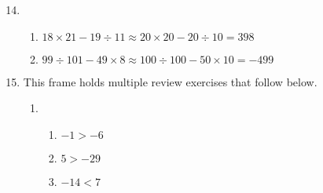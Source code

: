 \documentclass[fleqn]{article}
\begin{document}
\begin{enumerate}[label=\textbf{\arabic*.}]
\setcounter{enumi}{13}
\item 
\begin{enumerate}[label=\textbf{(\alph*)}]
\item $ 18 \times 21 - 19 \div 11 \approx 20 \times 20 - 20 \div 10 = 398 $
\item $ 99 \div 101 - 49 \times 8 \approx 100 \div 100 - 50 \times 10 = -499 $
\end{enumerate}

\setcounter{enumi}{16}
\item This frame holds multiple review exercises that follow below.

\begin{enumerate}[label=\textbf{\arabic*.}]
\item

\begin{enumerate}[label=\textbf{(\alph*)}]
\item $ -1 > -6 $
\item $ 5 > -29 $
\item $ -14 < 7 $ 
\end{enumerate}

\end{enumerate}

\end{enumerate}
\end{document}
